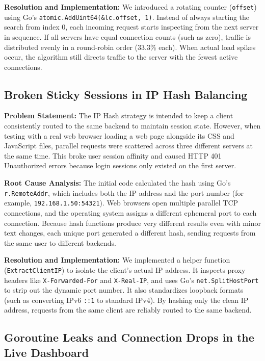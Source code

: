 \documentclass[12pt,openany]{report}
\begin{document}
\textbf{Resolution and Implementation:} We introduced a rotating counter (\texttt{offset}) using Go's \texttt{atomic.AddUint64(\&lc.offset, 1)}. Instead of always starting the search from index 0, each incoming request starts inspecting from the next server in sequence. If all servers have equal connection counts (such as zero), traffic is distributed evenly in a round-robin order (33.3\% each). When actual load spikes occur, the algorithm still directs traffic to the server with the fewest active connections.

\subsection{Broken Sticky Sessions in IP Hash Balancing}

\textbf{Problem Statement:} The IP Hash strategy is intended to keep a client consistently routed to the same backend to maintain session state. However, when testing with a real web browser loading a web page alongside its CSS and JavaScript files, parallel requests were scattered across three different servers at the same time. This broke user session affinity and caused HTTP 401 Unauthorized errors because login sessions only existed on the first server.

\textbf{Root Cause Analysis:} The initial code calculated the hash using Go's \texttt{r.RemoteAddr}, which includes both the IP address and the port number (for example, \texttt{192.168.1.50:54321}). Web browsers open multiple parallel TCP connections, and the operating system assigns a different ephemeral port to each connection. Because hash functions produce very different results even with minor text changes, each unique port generated a different hash, sending requests from the same user to different backends.

\textbf{Resolution and Implementation:} We implemented a helper function (\texttt{ExtractClientIP}) to isolate the client's actual IP address. It inspects proxy headers like \texttt{X-Forwarded-For} and \texttt{X-Real-IP}, and uses Go's \texttt{net.SplitHostPort} to strip out the dynamic port number. It also standardizes loopback formats (such as converting IPv6 \texttt{::1} to standard IPv4). By hashing only the clean IP address, requests from the same client are reliably routed to the same backend.

\subsection{Goroutine Leaks and Connection Drops in the Live Dashboard}
\end{document}
